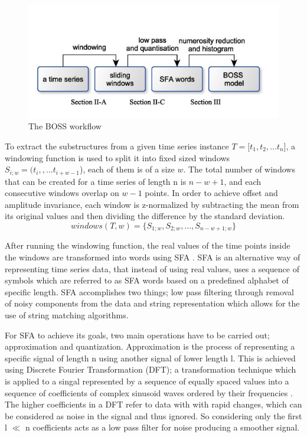 \begin{figure}[!htbp]
    \captionsetup{justification=raggedright}
    \centering
    \includegraphics[scale = 0.5]{BossFlow.JPG}
    \centering
    \caption{The BOSS workflow \cite{schafer2015boss}}
    \label{Img:BossFlow}
\end{figure}

To extract the substructures from a given time series instance $T = [t_{1},t_{2},...t_{n}$],
a windowing function is used to split it into fixed sized windows $S_{i;w} = (t_{i},,...t_{i+w-1}$), each of them is of a size $w$.
The total number of windows that can be created for a time series of length n is $n-w+1$, and each consecutive windows overlap on $w-1$ points.
In order to achieve offset and amplitude invariance, each window is z-normalized by subtracting the mean from its original values and then dividing the difference
by the standard deviation.
\begin{equation}
    windows(T,w) = \{ S_{1;w}, S_{2;w}, ...,  S_{n-w+1;w} \}
\end{equation}

After running the windowing function, the real values of the time points inside the windows are transformed into words using SFA \cite{schafer2012sfa}.
SFA is an alternative way of representing time series data, that instead of using real values, uses a sequence of symbols which are referred to as SFA words based on a predefined alphabet of specific length.
SFA accomplishes two things; low pass filtering through removal of noisy components from the data and string representation which allows for the use of string matching algorithms.

For SFA to achieve its goals, two main operations have to be carried out; approximation and quantization.
Approximation is the process of representing a specific signal of length n using another signal of lower length l.
This is achieved using Discrete Fourier Transformation (DFT); a transformation technique which is applied to a singal represented by a sequence of equally spaced values
into a sequence of coefficients of complex sinusoid waves ordered by their frequencies \cite{liao2017separable}. The higher coefficients in a DFT refer to data with
with rapid changes, which can be considered as noise in the signal and thus ignored. So considering only the first l $\ll$ n coefficients acts as a low pass filter for noise
producing a smoother signal.


